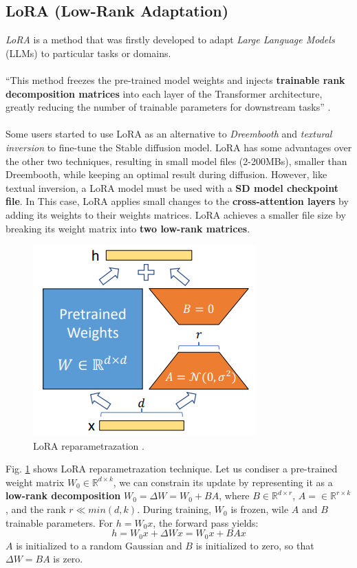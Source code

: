 \documentclass[preprint]{elsarticle}
\begin{document}
\subsection{LoRA (Low-Rank Adaptation)}
\emph{LoRA} \cite{hu2021lora} is a method that was firstly developed to adapt 
\emph{Large Language Models} (LLMs) to particular tasks or domains.\\ \\
``This method freezes 
the pre-trained model weights and injects \textbf{trainable rank decomposition matrices} 
into each layer of the Transformer architecture, greatly reducing the number of trainable 
parameters for downstream tasks'' \cite{hu2021lora}. \\\\
Some users started to use LoRA as an alternative to \emph{Dreembooth} \cite{ruiz2022dreambooth} 
and \emph{textural inversion} \cite{gal2022image} to 
fine-tune the Stable diffusion model. LoRA has some advantages over the other two techniques, 
resulting in small model files (2-200MBs), smaller than Dreembooth, 
while keeping an optimal result during diffusion. However, like textual inversion, 
a LoRA model must be used with a \textbf{SD model checkpoint file}.
In This case, LoRA applies small changes to the \textbf{cross-attention layers} by adding its 
weights to their weights matrices.
LoRA achieves a smaller file size by breaking its weight matrix into \textbf{two low-rank matrices}.
\begin{figure}[H]
	\centering
	\includegraphics[scale=0.5]{img/background_img/LoRA.png}
	\caption{LoRA reparametrazation \cite{hu2021lora}.}
	\label{fig:lora}
\end{figure}
Fig. \ref{fig:lora} shows LoRA reparametrazation technique. Let us condiser a 
pre-trained weight matrix $W_0 \in \mathbb{R}^{d\times k}$, we can constrain its update
by representing it as a \textbf{low-rank decomposition} $W_0 = \Delta W=W_0+BA$, where $B \in \mathbb{R}^{d \times r}$,
$A= \in \mathbb{R}^{r \times k}$, and the rank $r \ll min(d,k)$.
During training, $W_0$ is frozen, wile $A$ and $B$ trainable parameters.
For $h = W_0x$, the forward pass yields:
\begin{equation}
	h = W_0x + \Delta Wx = W_0x + BAx
\end{equation}
$A$ is initialized to a random Gaussian and $B$ is initialized to zero, so that
$\Delta W = BA$ is zero.
\end{document}
